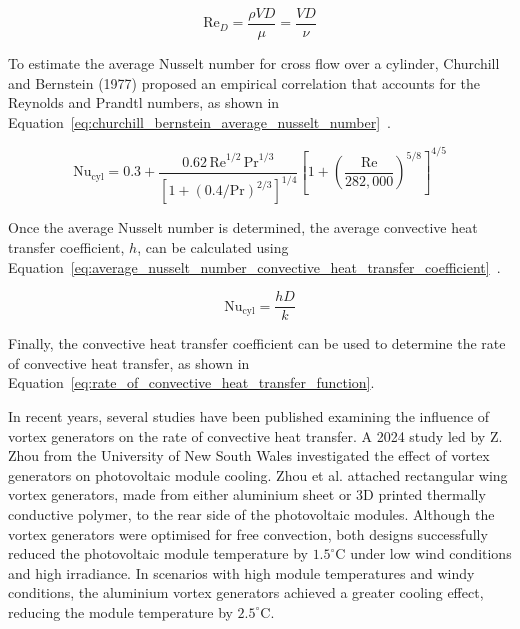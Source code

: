 \begin{equation}
    \text{Re}_D = \frac{\rho V D}{\mu} = \frac{V D}{\nu}
    \label{eq:reynolds_number}
\end{equation}

To estimate the average Nusselt number for cross flow over a cylinder, Churchill and Bernstein (1977) proposed an empirical correlation that accounts for the Reynolds and Prandtl numbers, as shown in Equation~\ref{eq:churchill_bernstein_average_nusselt_number}~\cite{Cengel2014ExternalConvection}.

\begin{equation}
    \text{Nu}_{\text{cyl}} = 0.3 + \frac{0.62\,\text{Re}^{1/2}\,\text{Pr}^{1/3}}{\left[1 + (0.4/\text{Pr})^{2/3}\right]^{1/4}} \left[1 + \left(\frac{\text{Re}}{282,000}\right)^{5/8}\right]^{4/5}
    \label{eq:churchill_bernstein_average_nusselt_number}
\end{equation}

Once the average Nusselt number is determined, the average convective heat transfer coefficient, \(h\), can be calculated using Equation~\ref{eq:average_nusselt_number_convective_heat_transfer_coefficient}~\cite{Cengel2014ExternalConvection}.

\begin{equation}
    \text{Nu}_{\text{cyl}} = \frac{h D}{k}
    \label{eq:average_nusselt_number_convective_heat_transfer_coefficient}
\end{equation}

Finally, the convective heat transfer coefficient can be used to determine the rate of convective heat transfer, as shown in Equation~\ref{eq:rate_of_convective_heat_transfer_function}. \cite{Cengel2014IntroductionConcepts} \vspace{0.5em}

In recent years, several studies have been published examining the influence of vortex generators on the rate of convective heat transfer. A 2024 study led by Z. Zhou from the University of New South Wales investigated the effect of vortex generators on photovoltaic module cooling. Zhou et al. attached rectangular wing vortex generators, made from either aluminium sheet or 3D printed thermally conductive polymer, to the rear side of the photovoltaic modules. Although the vortex generators were optimised for free convection, both designs successfully reduced the photovoltaic module temperature by $1.5^{\circ} \text{C}$ under low wind conditions and high irradiance. In scenarios with high module temperatures and windy conditions, the aluminium vortex generators achieved a greater cooling effect, reducing the module temperature by $2.5^{\circ} \text{C}$. \cite{Zhou2024Long-termCooling} \vspace{0.5em}


